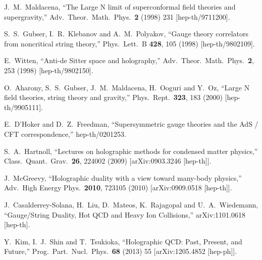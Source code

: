 \documentclass[12pt,notitlepage,a4paper]{article}
\begin{document}
\begin{thebibliography}{99.}%
%
%
  J.~M.~Maldacena,
  ``The Large N limit of superconformal field theories and supergravity,''
  Adv.\ Theor.\ Math.\ Phys.\  {\bf 2} (1998) 231
  [hep-th/9711200].
 
 
  S.~S.~Gubser, I.~R.~Klebanov and A.~M.~Polyakov,
  ``Gauge theory correlators from noncritical string theory,''
  Phys.\ Lett.\ B {\bf 428}, 105 (1998)
  [hep-th/9802109].
 
  E.~Witten,
  ``Anti-de Sitter space and holography,''
  Adv.\ Theor.\ Math.\ Phys.\  {\bf 2}, 253 (1998)
  [hep-th/9802150].
 
  O.~Aharony, S.~S.~Gubser, J.~M.~Maldacena, H.~Ooguri and Y.~Oz,
  ``Large N field theories, string theory and gravity,''
  Phys.\ Rept.\  {\bf 323}, 183 (2000)
  [hep-th/9905111].
  
  E.~D'Hoker and D.~Z.~Freedman,
  ``Supersymmetric gauge theories and the AdS / CFT correspondence,''
  hep-th/0201253.
  
  S.~A.~Hartnoll,
  ``Lectures on holographic methods for condensed matter physics,''
  Class.\ Quant.\ Grav.\  {\bf 26}, 224002 (2009)
  [arXiv:0903.3246 [hep-th]].
 
 
  J.~McGreevy,
  ``Holographic duality with a view toward many-body physics,''
  Adv.\ High Energy Phys.\  {\bf 2010}, 723105 (2010)
  [arXiv:0909.0518 [hep-th]].
 
 
  J.~Casalderrey-Solana, H.~Liu, D.~Mateos, K.~Rajagopal and U.~A.~Wiedemann,
  ``Gauge/String Duality, Hot QCD and Heavy Ion Collisions,''
  arXiv:1101.0618 [hep-th].
  
  Y.~Kim, I.~J.~Shin and T.~Tsukioka,
  ``Holographic QCD: Past, Present, and Future,''
  Prog.\ Part.\ Nucl.\ Phys.\  {\bf 68} (2013) 55
  [arXiv:1205.4852 [hep-ph]].
 

\end{thebibliography}
\end{document}
